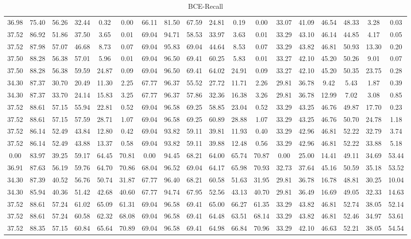 \begin{table}
\caption{BCE-Recall}
\begin{tabular}{cccccccccccccccccc}
36.98& 75.40& 56.26& 32.44& 0.32& 0.00& 66.11& 81.50& 67.59& 24.81& 0.19& 0.00& 33.07& 41.09& 46.54& 48.33& 3.28& 0.03\tabularnewline
37.52& 86.92& 51.86& 37.50& 3.65& 0.01& 69.04& 94.71& 58.53& 33.97& 3.63& 0.01& 33.29& 43.10& 46.14& 44.85& 4.17& 0.05\tabularnewline
37.52& 87.98& 57.07& 46.68& 8.73& 0.07& 69.04& 95.83& 69.04& 44.64& 8.53& 0.07& 33.29& 43.82& 46.81& 50.93& 13.30& 0.20\tabularnewline
37.50& 88.28& 56.38& 57.01& 5.96& 0.01& 69.04& 96.50& 69.41& 60.25& 5.83& 0.01& 33.27& 42.10& 45.20& 50.26& 9.01& 0.07\tabularnewline
37.50& 88.28& 56.38& 59.59& 24.87& 0.09& 69.04& 96.50& 69.41& 64.02& 24.91& 0.09& 33.27& 42.10& 45.20& 50.35& 23.75& 0.28\tabularnewline
34.30& 87.37& 30.70& 20.49& 11.30& 2.25& 67.77& 96.37& 55.52& 27.72& 11.71& 2.26& 29.81& 36.78& 9.42& 5.43& 1.87& 0.39\tabularnewline
34.30& 87.37& 33.70& 24.14& 15.83& 3.25& 67.77& 96.37& 57.86& 32.36& 16.38& 3.26& 29.81& 36.78& 12.99& 7.02& 3.08& 0.85\tabularnewline
37.52& 88.61& 57.15& 55.94& 22.81& 0.52& 69.04& 96.58& 69.25& 58.85& 23.04& 0.52& 33.29& 43.25& 46.76& 49.87& 17.70& 0.23\tabularnewline
37.52& 88.61& 57.15& 57.59& 28.71& 1.07& 69.04& 96.58& 69.25& 60.89& 28.88& 1.07& 33.29& 43.25& 46.76& 50.70& 24.78& 1.18\tabularnewline
37.52& 86.14& 52.49& 43.84& 12.80& 0.42& 69.04& 93.82& 59.11& 39.81& 11.93& 0.40& 33.29& 42.96& 46.81& 52.22& 32.79& 3.74\tabularnewline
37.52& 86.14& 52.49& 43.88& 13.37& 0.58& 69.04& 93.82& 59.11& 39.88& 12.48& 0.56& 33.29& 42.96& 46.81& 52.22& 33.88& 5.18\tabularnewline
0.00& 83.97& 39.25& 59.17& 64.45& 70.81& 0.00& 94.45& 68.21& 64.00& 65.74& 70.87& 0.00& 25.00& 14.41& 49.11& 34.69& 53.44\tabularnewline
36.91& 87.63& 56.19& 59.76& 64.70& 70.86& 68.04& 96.52& 69.04& 64.17& 65.98& 70.93& 32.73& 37.64& 45.16& 50.59& 35.18& 53.52\tabularnewline
34.30& 87.39& 40.52& 56.76& 50.74& 31.87& 67.77& 96.40& 68.21& 60.58& 51.63& 31.95& 29.81& 36.78& 16.78& 48.81& 30.25& 10.04\tabularnewline
34.30& 85.94& 40.36& 51.42& 42.68& 40.60& 67.77& 94.74& 67.95& 52.56& 43.13& 40.70& 29.81& 36.49& 16.69& 49.05& 32.33& 14.63\tabularnewline
37.52& 88.61& 57.24& 61.02& 65.09& 61.31& 69.04& 96.58& 69.41& 65.00& 66.27& 61.35& 33.29& 43.82& 46.81& 52.74& 38.05& 52.14\tabularnewline
37.52& 88.61& 57.24& 60.58& 62.32& 68.08& 69.04& 96.58& 69.41& 64.48& 63.51& 68.14& 33.29& 43.82& 46.81& 52.46& 34.97& 53.61\tabularnewline
37.52& 88.35& 57.15& 60.84& 65.64& 70.89& 69.04& 96.58& 69.41& 64.98& 66.84& 70.96& 33.29& 42.10& 46.63& 52.21& 38.05& 54.54\tabularnewline

\end{tabular}
\end{table}
